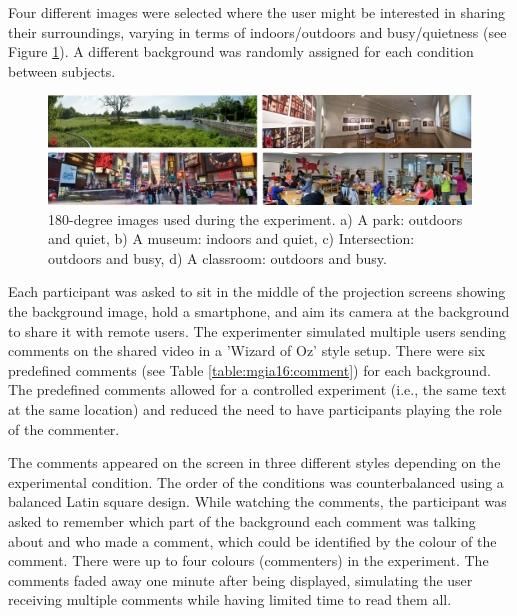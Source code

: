 Four different images were selected where the user might be interested in sharing their surroundings, varying in terms of indoors/outdoors and busy/quietness (see Figure \ref{fig:mgia16:backgrounds}). A different background was randomly assigned for each condition between subjects. 

\begin{figure}[ht]
  \centering
  \includegraphics[width=\linewidth]{images/61-video-mgia16/backgrounds-legend.png}
  \caption{180-degree images used during the experiment. a) A park: outdoors and quiet, b) A museum: indoors and quiet, c) Intersection: outdoors and busy, d) A classroom: outdoors and busy.}
    \label{fig:mgia16:backgrounds}
\end{figure}

Each participant was asked to sit in the middle of the projection screens showing the background image, hold a smartphone, and aim its camera at the background to share it with remote users. The experimenter simulated multiple users sending comments on the shared video in a 'Wizard of Oz' style setup. There were six predefined comments (see Table \ref{table:mgia16:comment}) for each background. The predefined comments allowed for a controlled experiment (i.e., the same text at the same location) and reduced the need to have participants playing the role of the commenter. 

The comments appeared on the screen in three different styles depending on the experimental condition. The order of the conditions was counterbalanced using a balanced Latin square design. While watching the comments, the participant was asked to remember which part of the background each comment was talking about and who made a comment, which could be identified by the colour of the comment. There were up to four colours (commenters) in the experiment. The comments faded away one minute after being displayed, simulating the user receiving multiple comments while having limited time to read them all.

